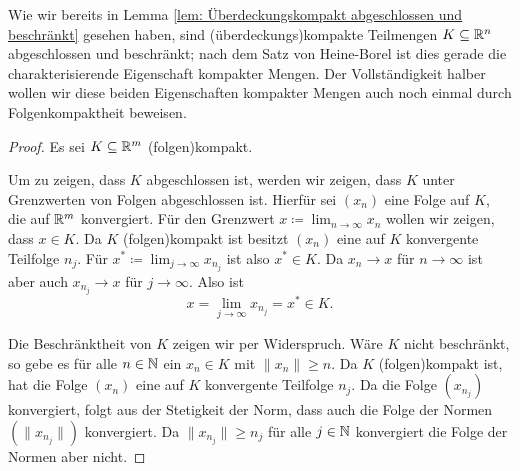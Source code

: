 \documentclass[a4paper,10pt]{article}
\begin{document}
Wie wir bereits in Lemma \ref{lem: Überdeckungskompakt abgeschlossen und beschränkt} gesehen haben, sind (überdeckungs)kompakte Teilmengen $K \subseteq \mathbb{R}^n$ abgeschlossen und beschränkt; nach dem Satz von Heine-Borel ist dies gerade die charakterisierende Eigenschaft kompakter Mengen. Der Vollständigkeit halber wollen wir diese beiden Eigenschaften kompakter Mengen auch noch einmal durch Folgenkompaktheit beweisen.


\begin{proof}
 Es sei $K \subseteq \mathbb{R}^m$ (folgen)kompakt.
 
 Um zu zeigen, dass $K$ abgeschlossen ist, werden wir zeigen, dass $K$ unter Grenzwerten von Folgen abgeschlossen ist. Hierfür sei $(x_n)$ eine Folge auf $K$, die auf $\mathbb{R}^m$ konvergiert. Für den Grenzwert $x \coloneqq \lim_{n \to \infty} x_n$ wollen wir zeigen, dass $x \in K$. Da $K$ (folgen)kompakt ist besitzt $(x_n)$ eine auf $K$ konvergente Teilfolge $n_j$. Für $x^* \coloneqq \lim_{j \to \infty} x_{n_j}$ ist also $x^* \in K$. Da $x_n \to x$ für $n \to \infty$ ist aber auch $x_{n_j} \to x$ für $j \to \infty$. Also ist
 \[
  x = \lim_{j \to \infty} x_{n_j} = x^* \in K.
 \]
 
 Die Beschränktheit von $K$ zeigen wir per Widerspruch. Wäre $K$ nicht beschränkt, so gebe es für alle $n \in \mathbb{N}$ ein $x_n \in K$ mit $\|x_n\| \geq n$. Da $K$ (folgen)kompakt ist, hat die Folge $(x_n)$ eine auf $K$ konvergente Teilfolge $n_j$. Da die Folge $(x_{n_j})$ konvergiert, folgt aus der Stetigkeit der Norm, dass auch die Folge der Normen $(\|x_{n_j}\|)$ konvergiert. Da $\|x_{n_j}\| \geq n_j$ für alle $j \in \mathbb{N}$ konvergiert die Folge der Normen aber nicht.
\end{proof}
\end{document}
